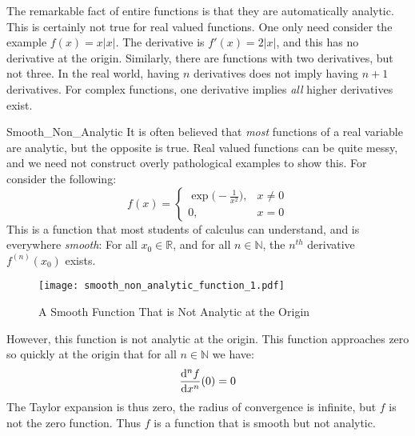     The remarkable fact of entire functions is that they are automatically
    analytic. This is certainly not true for real valued functions. One
    only need consider the example $f(x)=x|x|$. The derivative is
    $f'(x)=2|x|$, and this has no derivative at the
    origin. Similarly, there are functions with two derivatives,
    but not three. In the real world, having $n$ derivatives does
    not imply having $n+1$ derivatives. For complex functions, one
    derivative implies \textit{all} higher derivatives exist.
    \begin{lexample}{}{Smooth_Non_Analytic}%
        It is often believed that \textit{most} functions of a
        real variable are analytic, but the opposite is true. Real valued
        functions can be quite messy, and we need not construct overly
        pathological examples to show this. For consider the following:
        \begin{equation}
            f(x)=
            \begin{cases}
                \exp\big(\!\minus\!\frac{1}{x^{2}}\big),&x\ne{0}\\
                0,&x=0
            \end{cases}
        \end{equation}
        This is a function that most students of calculus can understand,
        and is everywhere \textit{smooth}: For all $x_{0}\in\mathbb{R}$,
        and for all $n\in\mathbb{N}$, the $n^{th}$ derivative
        $f^{(n)}(x_{0})$ exists.
        \begin{figure}[H]
            \centering
            \captionsetup{type=figure}
            \texttt{[image: smooth\_non\_analytic\_function\_1.pdf]}
            \caption{A Smooth Function That is Not Analytic at the Origin}
            \label{fig:Smooth_Not_Analytic_At_Origin}
        \end{figure}
        However, this function is not analytic at the origin. This
        function approaches zero so quickly at the origin that for all
        $n\in\mathbb{N}$ we have:
        \begin{equation}
            \frac{\mathop{}\!\mathrm{d}^{n}f}{\mathop{}\!\mathrm{d}{x}^{n}}(0)=0
        \end{equation}
        The Taylor expansion is thus zero, the radius of convergence
        is infinite, but $f$ is not the zero function. Thus $f$ is a
        function that is smooth but not analytic.
    \end{lexample}
